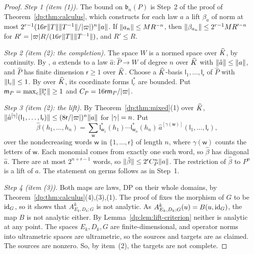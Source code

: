 \begin{proof}
\emph{Step 1 (item (1)).} The bound on $\mathfrak b_n(P)$ is Step~2 of the proof of Theorem~\ref{dp:thm:calculus}, which constructs for each law $a$ a lift $\beta_a$ of norm at most $2^{r-1}(16r\lVert T\rVert\lVert T^{-1}\rVert/\lvert \varpi\rvert)^n\lVert a\rVert$. If $\lVert a_n\rVert\le MR^{-n}$, then $\lVert \beta_{a_n}\rVert\le2^{r-1}MR'^{-n}$ for $R'=\lvert \varpi\rvert R/(16r\lVert T\rVert\lVert T^{-1}\rVert)$, and $R'\le R$.

\emph{Step 2 (item (2): the completion).} The space $W$ is a normed space over $\widehat K$, by continuity. By \cite[Lemma~Q.13(1),(2)]{I}, $a$ extends to a law $\hat a\colon\widehat P\to W$ of degree $n$ over $\widehat K$ with $\lVert \hat a\rVert\le\lVert a\rVert$, and $\widehat P$ has finite dimension $\mathsf r\ge1$ over $\widehat K$. Choose a $\widehat K$\nobreakdash-basis $\mathsf l_1,\dots,\mathsf l_{\mathsf r}$ of $\widehat P$ with $\lVert \mathsf l_c\rVert\le1$. By \cite[Lemma~A.3]{I} over $\widehat K$, its coordinate forms $\mathsf l_c^*$ are bounded. Put $\mathsf m_P=\max_c\lVert \mathsf l_c^*\rVert\ge1$ and $C_P=16\mathsf r\mathsf m_P/\lvert \varpi\rvert$.

\emph{Step 3 (item (2): the lift).} By Theorem~\ref{dp:thm:mixed}(1) over $\widehat K$, $\lVert \hat a^{[\gamma]}(\mathsf l_1,\dots,\mathsf l_{\mathsf r})\rVert\le(8\mathsf r/\lvert \varpi\rvert)^n\lVert a\rVert$ for $\lvert \gamma\rvert=n$. Put
\[
 \hat\beta(h_1,\dots,h_n)=\sum_{\mathsf w}\mathsf l^*_{\mathsf w_1}(h_1)\cdots\mathsf l^*_{\mathsf w_n}(h_n)\,\hat a^{[\gamma(\mathsf w)]}(\mathsf l_1,\dots,\mathsf l_{\mathsf r}),
\]
over the nondecreasing words $\mathsf w$ in $\{1,\dots,\mathsf r\}$ of length $n$, where $\gamma(\mathsf w)$ counts the letters of $\mathsf w$. Each monomial comes from exactly one such word, so $\hat\beta$ has diagonal $\hat a$. There are at most $2^{n+\mathsf r-1}$ words, so $\lVert \hat\beta\rVert\le2^{\mathsf r}C_P^n\lVert a\rVert$. The restriction of $\hat\beta$ to $P^n$ is a lift of $a$. The statement on germs follows as in Step~1.

\emph{Step 4 (item (3)).} Both maps are laws, DP on their whole domains, by Theorem~\ref{dp:thm:calculus}(4),(3),(1). The proof of \cite[Theorem~H.4]{I} fixes the morphism of $G$ to be $\mathrm{id}_G$, so it shows that $A^k_{E_k,D_k;G}$ is not analytic. As $A^k_{E_k,D_k;G}(u)=B(u,\mathrm{id}_G)$, the map $B$ is not analytic either. By Lemma~\ref{dp:lem:lift-criterion} neither is analytic at any point. The spaces $E_k,D_k,G$ are finite-dimensional, and operator norms into ultrametric spaces are ultrametric, so the sources and targets are as claimed. The sources are nonzero. So, by item~(2), the targets are not complete.
\end{proof}

